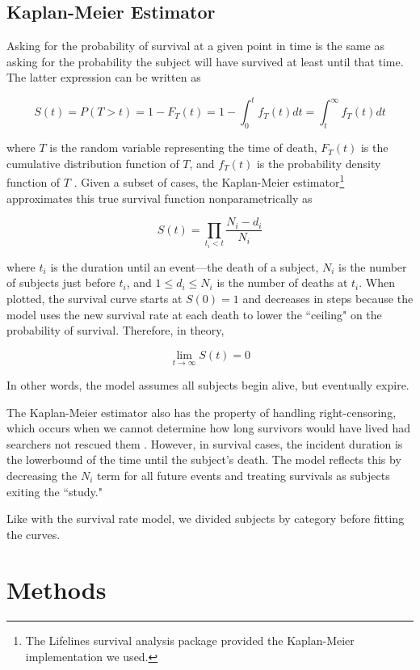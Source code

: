 \documentclass[12pt,titlepage]{article}
\begin{document}
    \subsection{Kaplan-Meier Estimator}
      Asking for the probability of survival at a given point in time is the
      same as asking for the probability the subject will have survived at
      least until that time. The latter expression can be written as

      $$S(t) = P(T > t) = 1 - F_T(t) = 1 - \int_0^t f_T(t) dt =
        \int_t^\infty f_T(t) dt$$

      where $T$ is the random variable representing the time of death, $F_T(t)$
      is the cumulative distribution function of $T$, and $f_T(t)$ is the
      probability density function of $T$ \cite{rochford}. Given a subset of
      cases, the Kaplan-Meier estimator\footnote{The Lifelines survival
      analysis package \cite{lifelines} provided the Kaplan-Meier
      implementation we used.} approximates this true survival function
      nonparametrically as

      $$S(t) = \prod_{t_i < t} \frac{N_i - d_i}{N_i}$$

      where $t_i$ is the duration until an event---the death of a subject,
      $N_i$ is the number of subjects just before $t_i$, and $1 \leq d_i \leq
      N_i$ is the number of deaths at $t_i$. When plotted, the survival curve
      starts at $S(0) = 1$ and decreases in steps because the model uses the
      new survival rate at each death to lower the ``ceiling" on the
      probability of survival. Therefore, in theory,

      $$\lim_{t \to \infty} S(t) = 0$$

      In other words, the model assumes all subjects begin alive, but
      eventually expire.

      The Kaplan-Meier estimator also has the property of handling
      right-censoring, which occurs when we cannot determine how long survivors
      would have lived had searchers not rescued them \cite{rich}. However, in
      survival cases, the incident duration is the lowerbound of the time until
      the subject's death. The model reflects this by decreasing the $N_i$ term
      for all future events and treating survivals as subjects exiting the
      ``study."

      Like with the survival rate model, we divided subjects by category before
      fitting the curves.

  \section{Methods}
\end{document}
